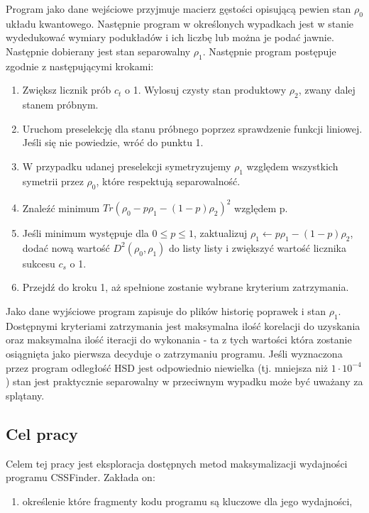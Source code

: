 \documentclass[11pt, a4paper]{article}
\begin{document}
\begin{sloppypar}
    Program jako dane wejściowe przyjmuje macierz gęstości opisującą pewien stan
    $\rho_{0}$ układu kwantowego. Następnie program w określonych wypadkach jest w stanie
    wydedukować wymiary podukładów i ich liczbę lub można je podać jawnie. Następnie
    dobierany jest stan separowalny $\rho_{1}$. Następnie program postępuje zgodnie z następującymi
    krokami:

    \begin{enumerate}
      \item Zwiększ licznik prób $c_{t}$ o 1. Wylosuj czysty stan produktowy $\rho_{2}$,
        zwany dalej stanem próbnym.

      \item Uruchom preselekcję dla stanu próbnego poprzez sprawdzenie funkcji liniowej.
        Jeśli się nie powiedzie, wróć do punktu 1.

      \item W przypadku udanej preselekcji symetryzujemy $\rho_{1}$ względem wszystkich symetrii
        przez $\rho_{0}$, które respektują separowalność.

      \item Znaleźć minimum $Tr(\rho_{0}- p\rho_{1}- (1 - p)\rho_{2})^{2}$ względem p.

      \item Jeśli minimum występuje dla $0 \le p \le 1$, zaktualizuj
        $\rho_{1}\leftarrow p\rho_{1}- (1 - p)\rho_{2}$, dodać nową wartość $D^{2}(\rho_{0}
        , \rho_{1})$ do listy listy i zwiększyć wartość licznika sukcesu $c_{s}$ o 1.

      \item Przejdź do kroku 1, aż spełnione zostanie wybrane kryterium zatrzymania.
    \end{enumerate}

    Jako dane wyjściowe program zapisuje do plików historię poprawek i stan $\rho_{1}$. Dostępnymi
    kryteriami zatrzymania jest maksymalna ilość korelacji do uzyskania oraz maksymalna ilość
    iteracji do wykonania - ta z tych wartości która zostanie osiągnięta jako pierwsza decyduje
    o zatrzymaniu programu. Jeśli wyznaczona przez program odległość HSD jest
    odpowiednio niewielka (tj. mniejsza niż $1 \cdot 10^{-4}$) stan jest praktycznie separowalny
    w przeciwnym wypadku może być uważany za splątany.

    \subsection{Cel pracy}
    Celem tej pracy jest eksploracja dostępnych metod maksymalizacji wydajności programu
    CSSFinder. Zakłada on:
    \begin{enumerate}
      \item określenie które fragmenty kodu programu są kluczowe dla jego wydajności,


\end{enumerate}
\end{sloppypar}
\end{document}
